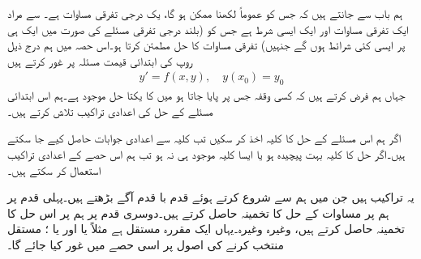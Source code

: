 
ہم باب  سے جانتے ہیں کہ  جس کو عموماً  لکھنا ممکن ہو گا، یک درجی تفرقی مساوات ہے۔ سے مراد ایک تفرقی مساوات اور ایک ایسی شرط ہے  جس کو (بلند درجی تفرقی مسئلے کی صورت میں ایک ہی  پر ایسی کئی شرائط ہوں گے جنہیں) تفرقی مساوات کا حل مطمئن کرتا ہو۔اس حصہ میں ہم درج ذیل روپ کی ابتدائی قیمت مسئلہ پر غور کرتے ہیں
\begin{align}\label{مساوات_اعدادی_ابتدائی_مسئلہ_الف}
y'=f(x,y),\quad y(x_0)=y_0
\end{align}
جہاں ہم فرض کرتے ہیں کہ کسی وقفہ جس پر  پایا جاتا ہو میں  کا یکتا حل موجود ہے۔ہم اس ابتدائی مسئلے کے حل کی اعدادی تراکیب تلاش کرتے ہیں۔

اگر ہم اس مسئلے کے حل کا کلیہ اخذ کر سکیں تب کلیہ سے اعدادی جوابات حاصل کیے جا سکتے ہیں۔اگر حل کا کلیہ بہت پیچیدہ ہو یا ایسا کلیہ موجود ہی نہ ہو تب ہم اس حصے کے  اعدادی تراکیب استعمال کر سکتے ہیں۔

یہ تراکیب  ہیں جن میں ہم   سے شروع کرتے ہوئے قدم با قدم آگے بڑھتے ہیں۔پہلی قدم پر ہم   پر مساوات  کے حل  کا تخمینہ  حاصل کرتے ہیں۔دوسری قدم پر ہم   پر اس حل کا تخمینہ  حاصل کرتے ہیں، وغیرہ وغیرہ۔یہاں  ایک مقررہ مستقل ہے مثلاً  یا  اور یا ؛ مستقل  منتخب کرنے کی اصول پر اسی حصے میں غور کیا جائے گا۔

